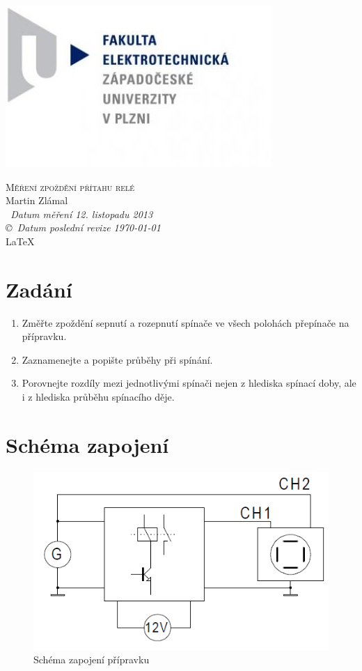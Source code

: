 \documentclass[12pt]{article} %
\begin{document}
\begin{titlepage}
	\includegraphics[scale=0.7]{logo.jpg}
	\vspace*{\fill}
	\begin{center}
		\textsc{\LARGE Měření zpoždění přítahu relé}\\[1cm]
		Martin Zlámal \\[1cm]
		{\small\em \ Datum měření 12. listopadu 2013 } \\
		{\small\em \copyright \ Datum poslední revize \today } \\
		\LaTeX
	\end{center}
	\vspace*{\fill}
\end{titlepage}
\newpage

\section{Zadání}
\begin{enumerate}
\item Změřte zpoždění sepnutí a rozepnutí spínače ve všech polohách přepínače na
přípravku.
\item Zaznamenejte a popište průběhy při spínání.
\item Porovnejte rozdíly mezi jednotlivými spínači nejen z hlediska spínací doby, ale i
z hlediska průběhu spínacího děje.
\end{enumerate}

\section{Schéma zapojení}
\begin{figure}[H]
\center
\includegraphics[scale=0.8]{schema.png}
\caption{Schéma zapojení přípravku}
\end{figure}
\end{document}
